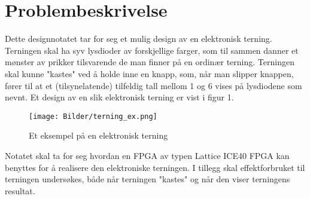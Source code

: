 \newpage
\section{Problembeskrivelse}
\label{problemBeskrivelse}

Dette designnotatet tar for seg et mulig design av en elektronisk terning. Terningen skal ha syv lysdioder av forskjellige farger, som til sammen 
danner et mønster av prikker tilsvarende de man finner på en ordinær terning. Terningen skal kunne "kastes" ved å holde inne en knapp, som, når man slipper 
knappen, fører til at et (tilsynelatende) tilfeldig tall mellom 1 og 6 vises på lysdiodene som nevnt. Et design av en slik elektronisk terning er vist 
i figur 1.

\begin{figure}[H]
    \centering
    \texttt{[image: Bilder/terning\_ex.png]}
    \caption{Et eksempel på en elektronisk terning}
\end{figure}

Notatet skal ta for seg hvordan en FPGA av typen Lattice ICE40 FPGA kan benyttes for å realisere den elektroniske terningen.
I tillegg skal effektforbruket til terningen undersøkes, både når terningen "kastes" og når den viser terningens resultat.
